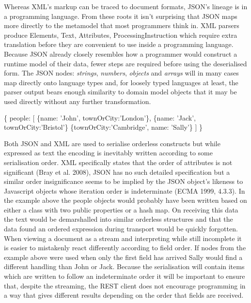 \documentclass[12pt, ]{article}
\newenvironment{Shaded}{}{}
\newcommand{\DataTypeTok}[1]{\textcolor[rgb]{0.56,0.13,0.00}{{#1}}}
\newcommand{\StringTok}[1]{\textcolor[rgb]{0.25,0.44,0.63}{{#1}}}
\newcommand{\NormalTok}[1]{{#1}}
\begin{document}
Whereas XML's markup can be traced to document formats, JSON's lineage
is in a programming language. From these roots it isn't surprising that
JSON maps more directly to the metamodel that most programmers think in.
XML parsers produce Elements, Text, Attributes, ProcessingInstruction
which require extra translation before they are convenient to use inside
a programming language. Because JSON already closely resembles how a
programmer would construct a runtime model of their data, fewer steps
are required before using the deserialised form. The JSON nodes:
\emph{strings}, \emph{numbers}, \emph{objects} and \emph{arrays} will in
many cases map directly onto language types and, for loosely typed
languages at least, the parser output bears enough similarity to domain
model objects that it may be used directly without any further
transformation.

\begin{Shaded}
\begin{Highlighting}[]
\NormalTok{\{}
   \DataTypeTok{people}\NormalTok{: [}
      \NormalTok{\{}\DataTypeTok{name}\NormalTok{: }\StringTok{'John'}\NormalTok{, }\DataTypeTok{townOrCity}\NormalTok{:}\StringTok{'London'}\NormalTok{\},}
      \NormalTok{\{}\DataTypeTok{name}\NormalTok{: }\StringTok{'Jack'}\NormalTok{, }\DataTypeTok{townOrCity}\NormalTok{:}\StringTok{'Bristol'}\NormalTok{\}}
      \NormalTok{\{}\DataTypeTok{townOrCity}\NormalTok{:}\StringTok{'Cambridge'}\NormalTok{, }\DataTypeTok{name}\NormalTok{: }\StringTok{'Sally'}\NormalTok{\}}
   \NormalTok{]}
\NormalTok{\}}
\end{Highlighting}
\end{Shaded}

Both JSON and XML are used to serialise orderless constructs but while
expressed as text the encoding is inevitably written according to some
serialisation order. XML specifically states that the order of
attributes is not significant (Bray et al. 2008), JSON has no such
detailed specification but a similar order insignificance seems to be
implied by the JSON object's likeness to Javascript objects whose
iteration order is indeterminate (ECMA 1999, 4.3.3). In the example
above the people objects would probably have been written based on
either a class with two public properties or a hash map. On receiving
this data the text would be demarshalled into similar orderless
structures and that the data found an ordered expression during
transport would be quickly forgotten. When viewing a document as a
stream and interpreting while still incomplete it is easier to
mistakenly react differently according to field order. If nodes from the
example above were used when only the first field has arrived Sally
would find a different handling than John or Jack. Because the
serialisation will contain items which are written to follow an
indeterminate order it will be important to ensure that, despite the
streaming, the REST client does not encourage programming in a way that
gives different results depending on the order that fields are received.
\end{document}
